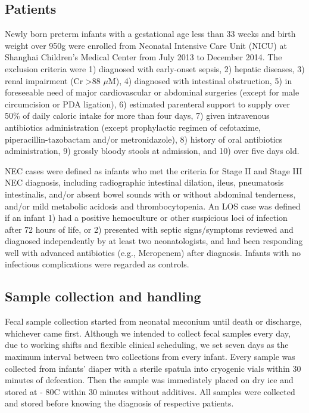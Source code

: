 \documentclass[fleqn,10pt]{wlpeerj} %
\begin{document}
  \subsection*{Patients}
  Newly born preterm infants with a gestational age less than 33 weeks and birth weight over 950g were enrolled from Neonatal Intensive Care Unit (NICU) at Shanghai Children’s Medical Center from July 2013 to December 2014. The exclusion criteria were 1) diagnosed with early-onset sepsis, 2) hepatic diseases, 3) renal impairment (Cr \textgreater 88 $\mu$M), 4) diagnosed with intestinal obstruction, 5) in foreseeable need of major cardiovascular or abdominal surgeries (except for male circumcision or PDA ligation), 6) estimated parenteral support to supply over 50\% of daily caloric intake for more than four days, 7) given intravenous antibiotics administration (except prophylactic regimen of cefotaxime, piperacillin-tazobactam and/or metronidazole), 8) history of oral antibiotics administration, 9) grossly bloody stools at admission, and 10) over five days old.

  NEC cases were defined as infants who met the criteria for Stage II and Stage III NEC diagnosis\citep{bell1978neonatal}, including radiographic intestinal dilation, ileus, pneumatosis intestinalis, and/or absent bowel sounds with or without abdominal tenderness, and/or mild metabolic acidosis and thrombocytopenia. An LOS case was defined if an infant 1) had a positive hemoculture or other suspicious loci of infection after 72 hours of life, or 2) presented with septic signs/symptoms reviewed and diagnosed independently by at least two neonatologists, and had been responding well with advanced antibiotics (e.g., Meropenem) after diagnosis. Infants with no infectious complications were regarded as controls.

  \subsection*{Sample collection and handling}
  Fecal sample collection started from neonatal meconium until death or discharge, whichever came first. Although we intended to collect fecal samples every day, due to working shifts and flexible clinical scheduling, we set seven days as the maximum interval between two collections from every infant. Every sample was collected from infants’ diaper with a sterile spatula into cryogenic vials within 30 minutes of defecation. Then the sample was immediately placed on dry ice and stored at - 80\textdegree{}C within 30 minutes without additives. All samples were collected and stored before knowing the diagnosis of respective patients.
\end{document}
